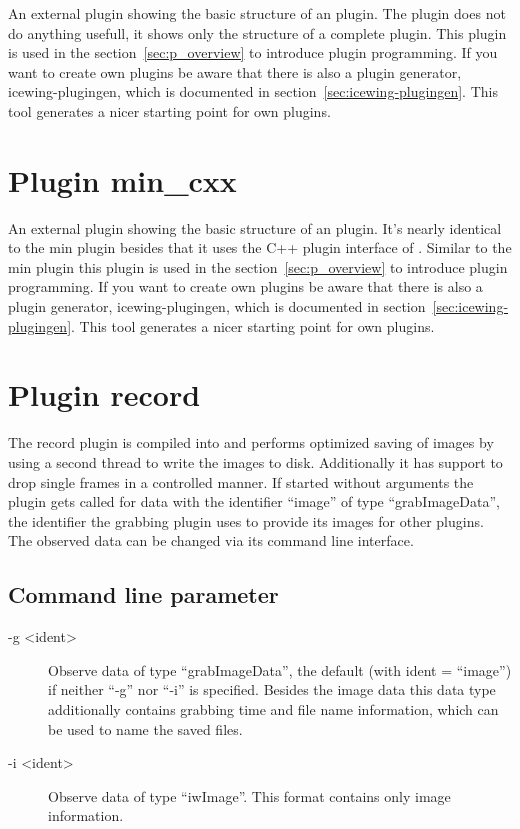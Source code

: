 An external plugin showing the basic structure of an \icewing{}
plugin. The plugin does not do anything usefull, it shows only the
structure of a complete plugin. This plugin is used in the
section~\ref{sec:p_overview} to introduce plugin programming. If you
want to create own plugins be aware that there is also a plugin
generator, icewing-plugingen, which is documented in
section~\ref{sec:icewing-plugingen}. This tool generates a nicer
starting point for own plugins.

\section{Plugin min\_cxx}

An external plugin showing the basic structure of an \icewing{}
plugin. It's nearly identical to the min plugin besides that it uses
the C++ plugin interface of \icewing{}. Similar to the min plugin
this plugin is used in the section~\ref{sec:p_overview} to introduce
plugin programming. If you want to create own plugins be aware that
there is also a plugin generator, icewing-plugingen, which is
documented in section~\ref{sec:icewing-plugingen}. This tool
generates a nicer starting point for own plugins.

\section{Plugin record}

The record plugin is compiled into \icewing{} and performs optimized
saving of images by using a second thread to write the images to disk.
Additionally it has support to drop single frames in a controlled
manner. If started without arguments the plugin gets called for data
with the identifier ``image'' of type ``grabImageData'', the
identifier the grabbing plugin uses to provide its images for other
plugins. The observed data can be changed via its command line
interface.

\subsection{Command line parameter}

\begin{description}
\item[-g \textless{}ident\textgreater{}]
  Observe data of type ``grabImageData'', the default (with ident =
  ``image'') if neither ``-g'' nor ``-i'' is specified. Besides the
  image data this data type additionally contains grabbing time and
  file name information, which can be used to name the saved files.
\item[-i \textless{}ident\textgreater{}]
  Observe data of type ``iwImage''. This format contains only image
  information.
\end{description}

